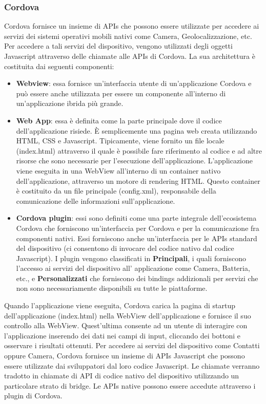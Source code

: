 \subsubsection{Cordova}
Cordova fornisce un insieme di APIs che possono essere utilizzate per accedere ai servizi dei sistemi operativi mobili nativi come Camera, Geolocalizzazione, etc. Per accedere a tali servizi del dispositivo, vengono utilizzati degli oggetti Javascript attraverso delle chiamate alle APIs di Cordova. La sua architettura è costituita dai seguenti componenti:
\begin{itemize}
    \item \textbf{Webview}: essa fornisce un'interfaccia utente di un'applicazione Cordova e può essere anche utilizzata per essere un componente all'interno di un'applicazione ibrida più grande.
    \item \textbf{Web App}: essa è definita come la parte principale dove il codice dell'applicazione risiede. È semplicemente una pagina web creata utilizzando HTML, CSS e Javascript. Tipicamente, viene fornito un file locale (index.html) attraverso il quale è possibile fare riferimento al codice e ad altre risorse che sono necessarie per l'esecuzione dell'applicazione. L'applicazione viene eseguita in una WebView all'interno di un container nativo dell'applicazione, attraverso un motore di rendering HTML. Questo container è costituito da un file principale (config.xml), responsabile della comunicazione delle informazioni sull'applicazione.
    \item \textbf{Cordova plugin}: essi sono definiti come una parte integrale dell'ecosistema Cordova che forniscono un'interfaccia per Cordova e per la comunicazione fra componenti nativi. Essi forniscono anche un'interfaccia per le APIs standard del dispositivo (ci consentono di invocare del codice nativo dal codice Javascript). I plugin vengono classificati in \textbf{Principali}, i quali forniscono l'accesso ai servizi del dispositivo all' applicazione come Camera, Batteria, etc., e \textbf{Personalizzati} che forniscono dei bindings addizionali per servizi che non sono necessariamente disponibili su tutte le piattaforme.
\end{itemize}

Quando l'applicazione viene eseguita, Cordova carica la pagina di startup dell'applicazione (index.html) nella WebView dell'applicazione e fornisce il suo controllo alla WebView. Quest'ultima consente ad un utente di interagire con l'applicazione inserendo dei dati nei campi di input, cliccando dei bottoni e osservare i risultati ottenuti. Per accedere ai servizi del dispositivo come Contatti oppure Camera, Cordova fornisce un insieme di APIs Javascript che possono essere utilizzate dai sviluppatori dal loro codice Javascript. Le chiamate verranno tradotto in chiamate di API di codice nativo del dispositivo utilizzando un particolare strato di bridge. Le APIs native possono essere accedute attraverso i plugin di Cordova.

